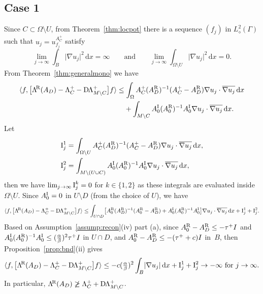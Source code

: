 \documentclass[reqno]{amsart}
\numberwithin{equation}{section}
\numberwithin{figure}{section}
\numberwithin{table}{section}
\theoremstyle{plain}
\theoremstyle{definition}
\theoremstyle{remark}
\newcommand{\abs}[1]{\lvert#1\rvert}
\newcommand{\inner}[1]{\langle#1\rangle}
\newcommand{\di}{\mathrm{d}}   %
\newcommand{\upR}{^{\textup{R}}}
\newcommand{\upI}{^{\textup{I}}}
\newcommand{\uptR}{^{\!\textup{R}}}
\newcommand{\LambdaR}{\Lambda\uptR}
\newcommand{\AR}{A\upR}
\newcommand{\AI}{A\upI}
\newcommand{\DLambda}{\textup{D}\mkern-1.5mu \Lambda}
\begin{document}
	\subsection*{Case 1}
	
	Since $C\subset \Omega\setminus U$, from Theorem~\ref{thm:locpot} there is a sequence $(f_j)$ in $L^2_\diamond(\Gamma)$ such that $u_j = u_{f_j}^{A_C^+}$ satisfy
	\begin{equation*}
		\lim_{j\to\infty} \int_B \abs{\nabla u_j}^2\,\di x = \infty \qquad \text{and} \qquad \lim_{j\to\infty}\int_{\Omega\setminus U} \abs{\nabla u_j}^2\,\di x = 0.
	\end{equation*}
	From Theorem~\ref{thm:generalmono} we have
	\begin{align*}
		\inner{f,\bigl[ \LambdaR(A_D) - \Lambda_C^+ - \DLambda_{M\setminus C}^+ \bigr]f} &\leq \int_\Omega A_C^+(\AR_D)^{-1}(A_C^+ - \AR_D)\nabla u_j\cdot\overline{\nabla u_j}\,\di x \\
		&\phantom{{}\leq}+ \int_{M\setminus C}\AI_0(\AR_0)^{-1}\AI_0\nabla u_j\cdot\overline{\nabla u_j}\,\di x.
	\end{align*}
	Let 
	\begin{align*}
		\textup{I}^1_j &= \int_{\Omega\setminus U} A_C^+(\AR_D)^{-1}(A_C^+ - \AR_D)\nabla u_j\cdot\overline{\nabla u_j}\,\di x, \\
		\textup{I}^2_j &= \int_{M\setminus(U\cup C)} \AI_0(\AR_0)^{-1}\AI_0\nabla u_j\cdot\overline{\nabla u_j}\,\di x, 
	\end{align*}
	then we have $\lim_{j\to\infty} \textup{I}_j^k = 0$ for $k\in\{1,2\}$ as these integrals are evaluated inside $\Omega\setminus U$. Since $\AI_0 = 0$ in $U\setminus D$ (from the choice of $U$), we have
	\begin{equation*}
		\inner{f,\bigl[ \LambdaR(A_D) - \Lambda_C^+ - \DLambda_{M\setminus C}^+ \bigr]f} \leq \int_{U\cap D} \bigl[\AR_0(\AR_D)^{-1}(\AR_0 - \AR_D) + \AI_0(\AR_0)^{-1}\AI_0 \bigr]\nabla u_j\cdot\overline{\nabla u_j}\,\di x + \textup{I}^1_j + \textup{I}^2_j.
	\end{equation*}
	Based on Assumption~\ref{assump:recon}(iv) part (a), since $\AR_0 - \AR_D \leq -\tau^+ I$ and $\AI_0(\AR_0)^{-1}\AI_0 \leq (\tfrac{\alpha}{\beta})^2\tau^+ I$ in $U\cap D$, and $\AR_0 - \AR_D \leq -(\tau^+ + c) I$ in~$B$, then Proposition~\ref{prop:bnd}(ii) gives
	\begin{equation*}
		\inner{f,\bigl[ \LambdaR(A_D) - \Lambda_C^+ - \DLambda_{M\setminus C}^+ \bigr]f} \leq -c(\tfrac{\alpha}{\beta})^2\int_B \abs{\nabla u_j}\,\di x + \textup{I}^1_j + \textup{I}^2_j \to -\infty \text{ for } j\to\infty.
	\end{equation*}
	In particular, $\LambdaR(A_D) \not\geq \Lambda^+_{C} + \DLambda_{M\setminus C}^+$.
	
\end{document}
